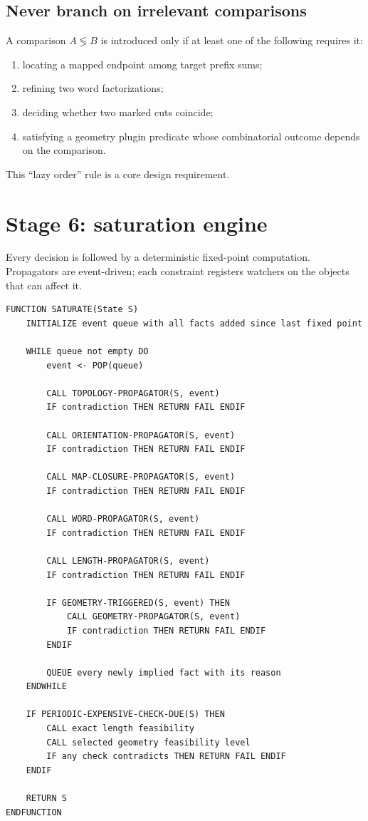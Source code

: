 \documentclass[11pt]{article}
\begin{document}
\subsection{Never branch on irrelevant comparisons}

A comparison $A\lessgtr B$ is introduced only if at least one of the following requires it:
\begin{enumerate}
  \item locating a mapped endpoint among target prefix sums;
  \item refining two word factorizations;
  \item deciding whether two marked cuts coincide;
  \item satisfying a geometry plugin predicate whose combinatorial outcome depends on the comparison.
\end{enumerate}
This ``lazy order'' rule is a core design requirement.

\section{Stage 6: saturation engine}
\label{sec:saturation}

Every decision is followed by a deterministic fixed-point computation.  Propagators are event-driven; each constraint registers watchers on the objects that can affect it.

\begin{lstlisting}[caption={Event-driven saturation.},label={alg:saturate}]
FUNCTION SATURATE(State S)
    INITIALIZE event queue with all facts added since last fixed point

    WHILE queue not empty DO
        event <- POP(queue)

        CALL TOPOLOGY-PROPAGATOR(S, event)
        IF contradiction THEN RETURN FAIL ENDIF

        CALL ORIENTATION-PROPAGATOR(S, event)
        IF contradiction THEN RETURN FAIL ENDIF

        CALL MAP-CLOSURE-PROPAGATOR(S, event)
        IF contradiction THEN RETURN FAIL ENDIF

        CALL WORD-PROPAGATOR(S, event)
        IF contradiction THEN RETURN FAIL ENDIF

        CALL LENGTH-PROPAGATOR(S, event)
        IF contradiction THEN RETURN FAIL ENDIF

        IF GEOMETRY-TRIGGERED(S, event) THEN
            CALL GEOMETRY-PROPAGATOR(S, event)
            IF contradiction THEN RETURN FAIL ENDIF
        ENDIF

        QUEUE every newly implied fact with its reason
    ENDWHILE

    IF PERIODIC-EXPENSIVE-CHECK-DUE(S) THEN
        CALL exact length feasibility
        CALL selected geometry feasibility level
        IF any check contradicts THEN RETURN FAIL ENDIF
    ENDIF

    RETURN S
ENDFUNCTION
\end{lstlisting}
\end{document}
